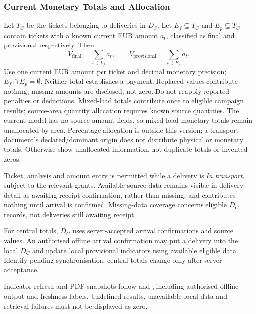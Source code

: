 \subsubsection{Current Monetary Totals and Allocation}
Let \(T_C\) be the tickets belonging to deliveries in \(D_C\).
Let \(E_f\subseteq T_C\) and \(E_p\subseteq T_C\) contain tickets with a known current
EUR amount \(a_t\), classified as final and provisional respectively. Then
\[
V_{\mathrm{final}}=\sum_{t\in E_f}a_t,\qquad
V_{\mathrm{provisional}}=\sum_{t\in E_p}a_t.
\]
Use one current EUR amount per ticket and decimal monetary precision;
\(E_f\cap E_p=\emptyset\). Neither total establishes a payment.
Replaced values contribute nothing; missing amounts are disclosed, not zero.
Do not reapply reported penalties or deductions.
Mixed-load totals contribute once to eligible campaign results; source-area
quantity allocation requires known source quantities. The current model has no source-amount fields, so mixed-load monetary totals remain unallocated by area. Percentage allocation is outside this version; a transport document's declared/dominant origin does not distribute physical or monetary totals.
Otherwise show unallocated information, not duplicate totals or invented zeros.

Ticket, analysis and amount entry is permitted while a delivery is
\textit{In transport}, subject to the relevant grants. Available source data remains
visible in delivery detail as awaiting receipt confirmation, rather than missing,
and contributes nothing until arrival is confirmed. Missing-data coverage concerns
eligible \(D_C\) records, not deliveries still awaiting receipt.

For central totals, \(D_C\) uses server-accepted arrival confirmations and source
values. An authorised offline arrival confirmation may put a delivery into the local
\(D_C\) and update local provisional indicators using available eligible data.
Identify pending synchronisation; central totals change only after server acceptance.

Indicator refresh and PDF snapshots follow \hyperref[fr:061]{} and
\hyperref[fr:062]{}, including authorised offline output and freshness labels.
Undefined results, unavailable local data and retrieval failures must not be
displayed as zero.
